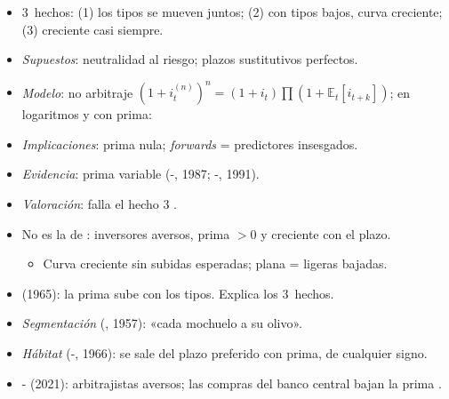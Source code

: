 \documentclass{article}
\begin{document}
\begin{columnas}
\begin{itemize}
\item 3~hechos: (1) los tipos se mueven juntos; (2) con tipos bajos, curva creciente; (3) creciente casi siempre.
\end{itemize}
\begin{itemize}
\item \emph{Supuestos}: neutralidad al riesgo; plazos sustitutivos perfectos.
\item \emph{Modelo}: no arbitraje $(1+i^{(n)}_t)^n=(1+i_t)\prod(1+\mathbb{E}_t[i_{t+k}])$; en logaritmos y con prima:
\item \emph{Implicaciones}: prima nula; \emph{forwards} = predictores insesgados.
\item \emph{Evidencia}: prima variable (-, 1987; -, 1991).
\item \emph{Valoración}: falla el hecho 3 .
\end{itemize}
\begin{itemize}
\item No es la de  : inversores aversos, prima $>0$ y creciente con el plazo.
  \begin{itemize}
  \item Curva creciente sin subidas esperadas; plana = ligeras bajadas.
  \end{itemize}
\item {} (1965): la prima sube con los tipos. Explica los 3~hechos.
\end{itemize}
\begin{itemize}
\item \emph{Segmentación} (, 1957): «cada mochuelo a su olivo».
\item \emph{Hábitat} (-, 1966): se sale del plazo preferido con prima, de cualquier signo.
\item {}- (2021): arbitrajistas aversos; las compras del banco central bajan la prima .

\end{itemize}
\end{columnas}
\end{document}
